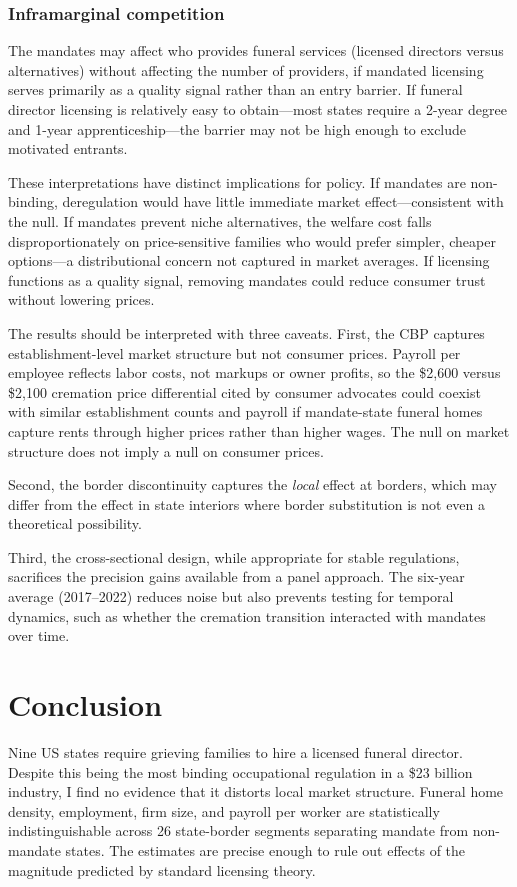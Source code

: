 \documentclass[12pt]{article}
\begin{document}
\subsubsection*{Inframarginal competition} The mandates may affect who provides funeral services (licensed directors versus alternatives) without affecting the number of providers, if mandated licensing serves primarily as a quality signal rather than an entry barrier. If funeral director licensing is relatively easy to obtain---most states require a 2-year degree and 1-year apprenticeship---the barrier may not be high enough to exclude motivated entrants.

These interpretations have distinct implications for policy. If mandates are non-binding, deregulation would have little immediate market effect---consistent with the null. If mandates prevent niche alternatives, the welfare cost falls disproportionately on price-sensitive families who would prefer simpler, cheaper options---a distributional concern not captured in market averages. If licensing functions as a quality signal, removing mandates could reduce consumer trust without lowering prices.

The results should be interpreted with three caveats. First, the CBP captures establishment-level market structure but not consumer prices. Payroll per employee reflects labor costs, not markups or owner profits, so the \$2,600 versus \$2,100 cremation price differential cited by consumer advocates could coexist with similar establishment counts and payroll if mandate-state funeral homes capture rents through higher prices rather than higher wages. The null on market structure does not imply a null on consumer prices.

Second, the border discontinuity captures the \textit{local} effect at borders, which may differ from the effect in state interiors where border substitution is not even a theoretical possibility.

Third, the cross-sectional design, while appropriate for stable regulations, sacrifices the precision gains available from a panel approach. The six-year average (2017--2022) reduces noise but also prevents testing for temporal dynamics, such as whether the cremation transition interacted with mandates over time.


\section{Conclusion}

Nine US states require grieving families to hire a licensed funeral director. Despite this being the most binding occupational regulation in a \$23 billion industry, I find no evidence that it distorts local market structure. Funeral home density, employment, firm size, and payroll per worker are statistically indistinguishable across 26 state-border segments separating mandate from non-mandate states. The estimates are precise enough to rule out effects of the magnitude predicted by standard licensing theory.
\end{document}
